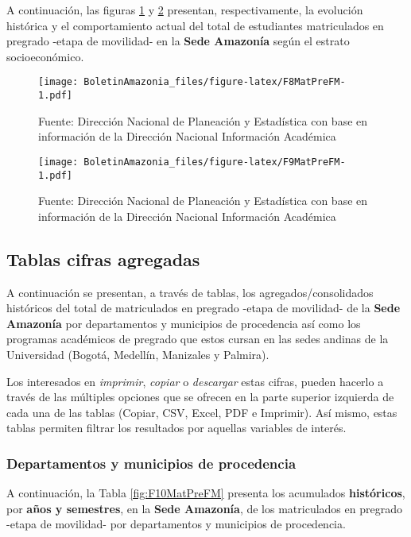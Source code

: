 \documentclass[
]{book}
\begin{document}
A continuación, las figuras \ref{fig:F8MatPreFM} y \ref{fig:F9MatPreFM} presentan, respectivamente, la evolución histórica y el comportamiento actual del total de estudiantes matriculados en pregrado -etapa de movilidad- en la \textbf{Sede Amazonía} según el estrato socioeconómico.

\begin{figure}
\centering
\texttt{[image: BoletinAmazonia\_files/figure-latex/F8MatPreFM-1.pdf]}
\caption{\label{fig:F8MatPreFM}Fuente: Dirección Nacional de Planeación y Estadística con base en información de la Dirección Nacional Información Académica}
\end{figure}

\begin{figure}
\centering
\texttt{[image: BoletinAmazonia\_files/figure-latex/F9MatPreFM-1.pdf]}
\caption{\label{fig:F9MatPreFM}Fuente: Dirección Nacional de Planeación y Estadística con base en información de la Dirección Nacional Información Académica}
\end{figure}

\hypertarget{tablas-cifras-agregadas-6}{%
\subsection{Tablas cifras agregadas}\label{tablas-cifras-agregadas-6}}

A continuación se presentan, a través de tablas, los agregados/consolidados históricos del total de matriculados en pregrado -etapa de movilidad- de la \textbf{Sede Amazonía} por departamentos y municipios de procedencia así como los programas académicos de pregrado que estos cursan en las sedes andinas de la Universidad (Bogotá, Medellín, Manizales y Palmira).

Los interesados en \emph{imprimir}, \emph{copiar} o \emph{descargar} estas cifras, pueden hacerlo a través de las múltiples opciones que se ofrecen en la parte superior izquierda de cada una de las tablas (Copiar, CSV, Excel, PDF e Imprimir). Así mismo, estas tablas permiten filtrar los resultados por aquellas variables de interés.

\hypertarget{departamentos-y-municipios-de-procedencia-4}{%
\subsubsection{Departamentos y municipios de procedencia}\label{departamentos-y-municipios-de-procedencia-4}}

A continuación, la Tabla \ref{fig:F10MatPreFM} presenta los acumulados \textbf{históricos}, por \textbf{años y semestres}, en la \textbf{Sede Amazonía}, de los matriculados en pregrado -etapa de movilidad- por departamentos y municipios de procedencia.
\end{document}
